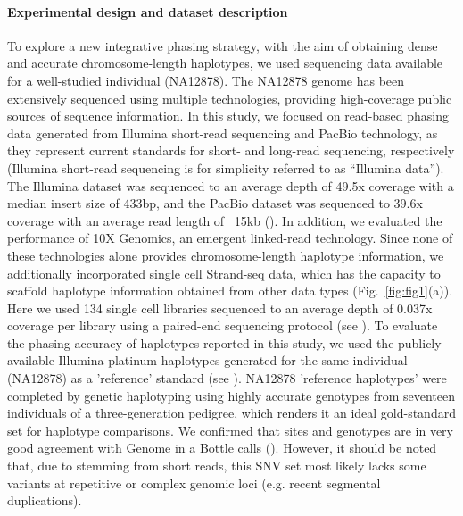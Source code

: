 \paragraph{Experimental design and dataset description}
	To explore a new integrative phasing strategy, with the aim of obtaining dense and accurate chromosome-length haplotypes, we used sequencing data available for a well-studied individual (NA12878). 
	The NA12878 genome has been extensively sequenced using multiple technologies, providing high-coverage public sources of sequence information. 	
	In this study, we focused on read-based phasing data generated from Illumina short-read sequencing and PacBio technology, as they represent current standards for short- and long-read sequencing, 
	respectively (Illumina short-read sequencing is for simplicity referred to as “Illumina data”). 
	The Illumina dataset was sequenced to an average depth of 49.5x coverage with a median insert size of 433bp, and the PacBio dataset was sequenced to 39.6x coverage with an average read length of ~15kb ().
	In addition, we evaluated the performance of 10X Genomics, an emergent linked-read technology. Since none of these technologies alone provides chromosome-length haplotype information, 
	we additionally incorporated single cell Strand-seq data, which has the capacity to scaffold haplotype information obtained from other data types (Fig.~\ref{fig:fig1}(a)). 
	Here we used 134 single cell libraries sequenced to an average depth of 0.037x coverage per library using a paired-end sequencing protocol (see ). 
	To evaluate the phasing accuracy of haplotypes reported in this study, we used the publicly available Illumina platinum haplotypes generated for the same individual (NA12878) as a 'reference' standard (see ). 
	NA12878 'reference haplotypes’ were completed by genetic haplotyping using highly accurate genotypes from seventeen individuals of a three-generation pedigree, which renders it an ideal gold-standard set for haplotype comparisons. 
	We confirmed that sites and genotypes are in very good agreement with Genome in a Bottle calls (). 
	However, it should be noted that, due to stemming from short reads, this SNV set most likely lacks some variants at repetitive or complex genomic loci (e.g. recent segmental duplications).


